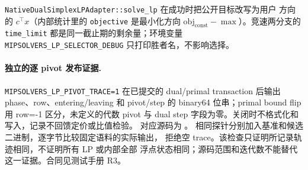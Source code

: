\begin{boundarynote}
\texttt{NativeDualSimplexLPAdapter::solve\_lp} 在成功时把公开目标改写为用户
方向的 $c^{\top}x$（内部统计里的 \texttt{objective} 是最小化方向
$\mathrm{obj}_{\text{const}} - \max$）。竞速两分支的 \texttt{time\_limit}
都是同一截止期的剩余量；环境变量 \texttt{MIPSOLVERS\_LP\_SELECTOR\_DEBUG}
只打印胜者名，不影响选择。
\end{boundarynote}

\paragraph{独立的逐 pivot 发布证据.}
\texttt{MIPSOLVERS\_LP\_PIVOT\_TRACE=1} 在已提交的 dual/primal
transaction 后输出 phase、row、entering/leaving 和 pivot/step 的
binary64 位串；primal bound flip 用 row=-1 区分，未定义的代数 pivot
与 dual step 字段为零。关闭时不格式化和写入，记录不回馈定价或比值检验。
对应源码为
。
相同探针分别加入基准和候选二进制，逐字节比较固定语料的实际输出，
拒绝空 trace。该检查只证明所记录轨迹相同，不证明所有 LP 或内部全部
浮点状态相同；源码范围和迭代数不能替代这一证据。合同见测试手册 R3。
